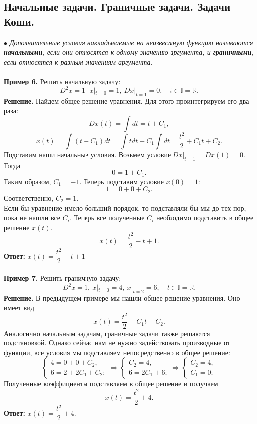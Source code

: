 \documentclass[a4paper, 12pt]{article}
\newcommand{\Rm}{\mathbb{R}}
\newcommand{\I}{\mathbb{I}}
\begin{document}
	\subsection*{Начальные задачи. Граничные задачи. Задачи Коши.}
	$\bullet$ \textit{Дополнительные условия накладываемые на неизвестную функцию называются \textbf{начальными}, если они относятся к одному значению аргумента, и \textbf{граничными}, если относятся к разным значениям аргумента.}\\\\
	\textbf{Пример 6.} Решить начальную задачу:
	$$D^2x = 1,\ x|_{t=0} = 1,\ Dx|_{t = 1} = 0,\quad t \in \I = \Rm.$$
	\textbf{Решение.} Найдем общее решение уравнения. Для этого проинтегрируем его два раза:
	$$Dx(t) = \int dt = t + C_1,$$
	$$x(t) = \int (t + C_1) dt = \int tdt + C_1\int dt = \dfrac{t^2}{2} + C_1t + C_2.$$
	Подставим наши начальные условия. Возьмем условие $Dx|_{t=1} = Dx(1) = 0$. Тогда $$ 0 = 1 + C_1.$$
	Таким образом, $C_1 = -1$. Теперь подставим условие $x(0) = 1$:
	$$1 = 0 + 0 + C_2.$$
	Соответственно, $C_2 = 1$.\\
	Если бы уравнение имело больший порядок, то подставляли бы мы до тех пор, пока не нашли все $C_i$. Теперь все полученные $C_i$ необходимо подставить в общее решение $x(t)$.
	$$x(t) = \dfrac{t^2}{2} - t + 1.$$
	\textbf{Ответ:} $x(t) = \dfrac{t^2}{2} - t + 1.$\\\\
	\textbf{Пример 7.} Решить граничную задачу:
	$$D^2x = 1,\ x|_{t=0} = 4,\ x|_{t = 2} = 6,\quad t \in \I = \Rm.$$
	\textbf{Решение.} В предыдущем примере мы нашли общее решение уравнения. Оно имеет вид $$x(t) =\dfrac{t^2}{2} + C_1t + C_2.$$
	Аналогично начальным задачам, граничные задачи также решаются подстановкой. Однако сейчас нам не нужно задействовать производные от функции, все условия мы подставляем непосредственно в общее решение:
	$$\begin{cases}
		4 = 0 + 0 + C_2,\\
		6 = 2 + 2C_1 + C_2;
	\end{cases}\Rightarrow\begin{cases}
	C_2 = 4,\\
	6 = 2C_1 + 6;
\end{cases}\Rightarrow \begin{cases}
	C_2 = 4,\\
	C_1 =0;
\end{cases}$$ Полученные коэффициенты подставляем в общее решение и получаем $$x(t) = \dfrac{t^2}{2} + 4.$$
\textbf{Ответ:} $x(t) = \dfrac{t^2}{2} + 4.$\\\\
\end{document}
